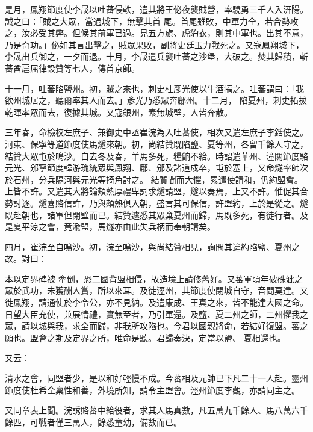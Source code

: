 \begin{pinyinscope}
 是月，鳳翔節度使李晟以吐蕃侵軼，遣其將王佖夜襲賊營，率驍勇三千人入汧陽。誡之曰：「賊之大眾，當過城下，無擊其首
 尾。首尾雖敗，中軍力全，若合勢攻之，汝必受其弊。但候其前軍已過。見五方旗、虎豹衣，則其中軍也。出其不意，乃是奇功。」佖如其言出擊之，賊眾果敗，副將史廷玉力戰死之。又寇鳳翔城下，李晟出兵御之，一夕而退。十月，李晟遣兵襲吐蕃之沙堡，大破之。焚其歸積，斬蕃酋扈屈律設贊等七人，傳首京師。



 十一月，吐蕃陷鹽州。初，賊之來也，刺史杜彥光使以牛酒犒之。吐蕃謂曰：「我欲州城居之，聽爾率其人而去。」彥光乃悉眾奔鄜州。十二月，
 陷夏州，刺史拓拔乾暉率眾而去，復據其城。又寇銀州，素無城壁，人皆奔散。



 三年春，命檢校左庶子、兼御史中丞崔浣為入吐蕃使，相次又遣左庶子李銛使之。河東、保寧等道節度使馬燧來朝。初，尚結贊既陷鹽、夏等州，各留千餘人守之，結贊大眾屯於鳴沙。自去冬及春，羊馬多死，糧餉不給。時詔遣華州、潼關節度駱元光、邠寧節度韓游瑰統眾與鳳翔、鄜、邠及諸道戍卒，屯於塞上，又命燧率師次於石州，分兵隔河與元光等掎角討之。
 結贊聞而大懼，累遣使請和，仍約盟會。上皆不許。又遣其大將論頰熱厚禮卑詞求燧請盟，燧以奏焉，上又不許。惟促其合勢討逐。燧喜賂信詐，乃與頰熱俱入朝，盛言其可保信，許盟約，上於是從之。燧既赴朝也，諸軍但閉壁而已。結贊遽悉其眾棄夏州而歸，馬既多死，有徒行者。及是夏平涼之會，竟渝盟，馬燧亦由此失兵柄而奉朝請矣。



 四月，崔浣至自鳴沙。初，浣至鳴沙，與尚結贊相見，詢問其違約陷鹽、夏州之故。對曰：



 本以定界碑被
 牽倒，恐二國背盟相侵，故造境上請修舊好。又蕃軍頃年破硃泚之眾於武功，未獲酬人賞，所以來耳。及徙涇州，其節度使閉城自守，音問莫達。又徙鳳翔，請通使於李令公，亦不見納。及遣康成、王真之來，皆不能達大國之命。日望大臣充使，兼展情禮，實無至者，乃引軍還。及鹽、夏二州之師，二州懼我之眾，請以城與我，求全而歸，非我所攻陷也。今君以國親將命，若結好復盟。蕃之願也。盟會之期及定界之所，唯命是聽。君歸奏決，定當以鹽、
 夏相還也。



 又云：



 清水之會，同盟者少，是以和好輕慢不成。今蕃相及元帥已下凡二十一人赴。靈州節度使杜希全稟性和善，外境所知，請令主盟會。涇州節度李觀，亦請同主之。



 又同章表上聞。浣誘賂蕃中給役者，求其人馬真數，凡五萬九千餘人、馬八萬六千餘匹，可戰者僅三萬人，餘悉童幼，備數而已。




\end{pinyinscope}
